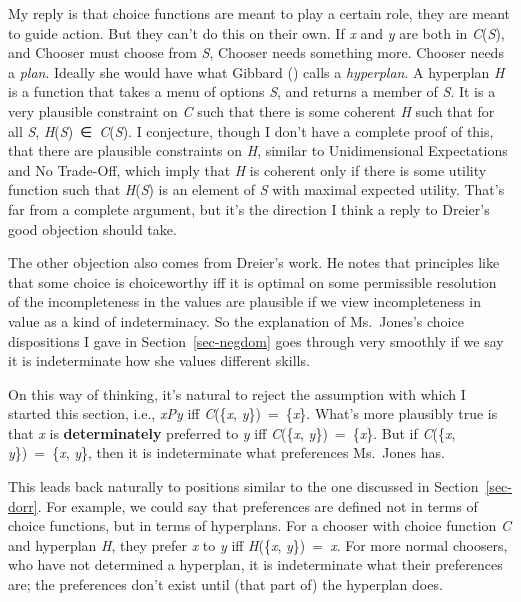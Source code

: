 \documentclass[
  11pt,
  letterpaper,
  DIV=11,
  numbers=noendperiod,
  twoside]{scrartcl}
\begin{document}
My reply is that choice functions are meant to play a certain role, they
are meant to guide action. But they can't do this on their own. If
\emph{x} and \emph{y} are both in \emph{C}(\emph{S}), and Chooser must
choose from \emph{S}, Chooser needs something more. Chooser needs a
\emph{plan}. Ideally she would have what Gibbard
() calls a \emph{hyperplan}. A hyperplan
\emph{H} is a function that takes a menu of options \emph{S}, and
returns a member of \emph{S}. It is a very plausible constraint on
\emph{C} such that there is some coherent \emph{H} such that for all
\emph{S}, \emph{H}(\emph{S})~∈~\emph{C}(\emph{S}). I conjecture, though
I don't have a complete proof of this, that there are plausible
constraints on \emph{H}, similar to Unidimensional Expectations and No
Trade-Off, which imply that \emph{H} is coherent only if there is some
utility function such that \emph{H}(\emph{S}) is an element of \emph{S}
with maximal expected utility. That's far from a complete argument, but
it's the direction I think a reply to Dreier's good objection should
take.

The other objection also comes from Dreier's work. He notes that
principles like that some choice is choiceworthy iff it is optimal on
some permissible resolution of the incompleteness in the values are
plausible if we view incompleteness in value as a kind of indeterminacy.
So the explanation of Ms.~Jones's choice dispositions I gave in
Section~\ref{sec-negdom} goes through very smoothly if we say it is
indeterminate how she values different skills.

On this way of thinking, it's natural to reject the assumption with
which I started this section, i.e., \emph{xPy} iff \emph{C}(\{\emph{x},
\emph{y}\})~=~\{\emph{x}\}. What's more plausibly true is that \emph{x}
is \textbf{determinately} preferred to \emph{y} iff \emph{C}(\{\emph{x},
\emph{y}\})~=~\{\emph{x}\}. But if \emph{C}(\{\emph{x},
\emph{y}\})~=~\{\emph{x}, \emph{y}\}, then it is indeterminate what
preferences Ms.~Jones has.

This leads back naturally to positions similar to the one discussed in
Section~\ref{sec-dorr}. For example, we could say that preferences are
defined not in terms of choice functions, but in terms of hyperplans.
For a chooser with choice function \emph{C} and hyperplan \emph{H}, they
prefer \emph{x} to \emph{y} iff \emph{H}(\{\emph{x},
\emph{y}\})~=~\emph{x}. For more normal choosers, who have not
determined a hyperplan, it is indeterminate what their preferences are;
the preferences don't exist until (that part of) the hyperplan does.
\end{document}
